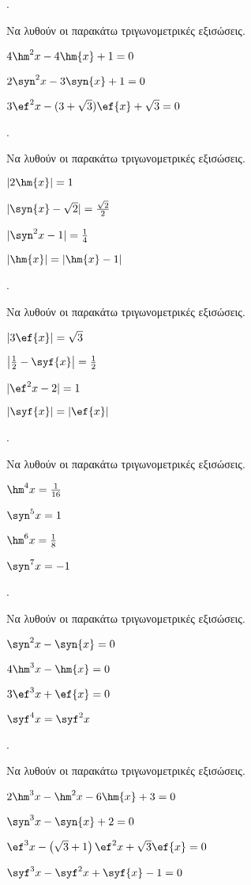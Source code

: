 \documentclass[11pt,a4paper,twocolumn]{article}
\newcounter{askhsh}
\newcommand{\askhsh}{\large\theaskhsh.\ \addtocounter{askhsh}{1}}
\begin{document}
\askhsh 
Να λυθούν οι παρακάτω τριγωνομετρικές εξισώσεις.
\begin{alist}
\item $ 4\hm^2{x}-4\hm{x}+1=0 $
\item $ 2\syn^2{x}-3\syn{x}+1=0 $
\item $ 3\ef^2{x}-(3+\sqrt{3})\ef{x}+\sqrt{3}=0 $
\end{alist}
\askhsh 
Να λυθούν οι παρακάτω τριγωνομετρικές εξισώσεις.
\begin{alist}
\item $ |2\hm{x}|=1 $
\item $ |\syn{x}-\sqrt{2}|=\frac{\sqrt{2}}{2} $
\item $ |\syn^2{x}-1|=\frac{1}{4} $
\item $ |\hm{x}|=|\hm{x}-1| $
\end{alist}
\askhsh 
Να λυθούν οι παρακάτω τριγωνομετρικές εξισώσεις.
\begin{alist}
\item $ |3\ef{x}|=\sqrt{3} $
\item $ \left| \frac{1}{2}-\syf{x}\right| =\frac{1}{2} $
\item $ |\ef^2{x}-2|=1 $
\item $ |\syf{x}|=|\ef{x}| $
\end{alist}
\askhsh 
Να λυθούν οι παρακάτω τριγωνομετρικές εξισώσεις.
\begin{multicols}{2}
\begin{alist}
\item $ \hm^4{x}=\frac{1}{16} $
\item $ \syn^5{x}=1 $
\item $ \hm^6{x}=\frac{1}{8} $
\item $ \syn^7{x}=-1 $
\end{alist}
\end{multicols}
\askhsh Να λυθούν οι παρακάτω τριγωνομετρικές εξισώσεις.
\begin{alist}
\item $ \syn^2{x}-\syn{x}=0 $
\item $ 4\hm^3{x}-\hm{x}=0 $
\item $ 3\ef^3{x}+\ef{x}=0 $
\item $ \syf^4{x}=\syf^2{x} $
\end{alist}
\askhsh Να λυθούν οι παρακάτω τριγωνομετρικές εξισώσεις.
\begin{alist}
\item $ 2\hm^3{x}-\hm^2{x}-6\hm{x}+3=0 $
\item $ \syn^3{x}-\syn{x}+2=0 $
\item $ \ef^3{x}-\left( \sqrt{3}+1\right) \ef^2{x}+\sqrt{3}\ef{x}=0 $
\item $ \syf^3{x}-\syf^2{x}+\syf{x}-1=0 $
\end{alist}
\end{document}
